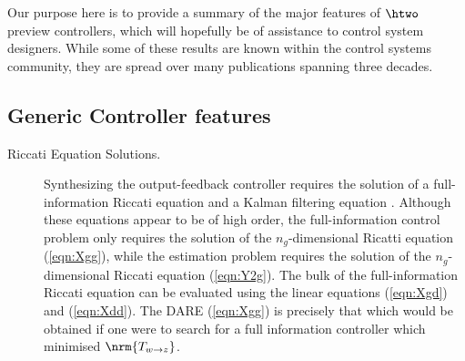 \label{sec:H2PrevSum}
Our purpose here is to provide a summary of the major features of $\htwo$ preview controllers, which will hopefully be of assistance to control system designers. While some of these results are known within the control systems community, they are spread over many publications spanning three decades. 
\subsection{Generic Controller features} \label{generic:features}
\begin{description}
\item[Riccati Equation Solutions.] Synthesizing the output-feedback controller requires the solution of a full-information Riccati equation and a Kalman filtering equation \cite{LimebeerGreen,ZDG}. Although these equations appear to be of high order, the full-information control problem only requires the solution of the $n_g$-dimensional Ricatti equation (\ref{eqn:Xgg}), while the estimation problem requires the solution of the $n_g$-dimensional Riccati equation (\ref{eqn:Y2g}). The bulk of the full-information Riccati equation can be evaluated using the linear equations (\ref{eqn:Xgd}) and (\ref{eqn:Xdd}). The DARE (\ref{eqn:Xgg}) is precisely that which would be obtained if one were to search for a full information controller which minimised $\nrm{T_{w\rightarrow z}}$.


\end{description}
